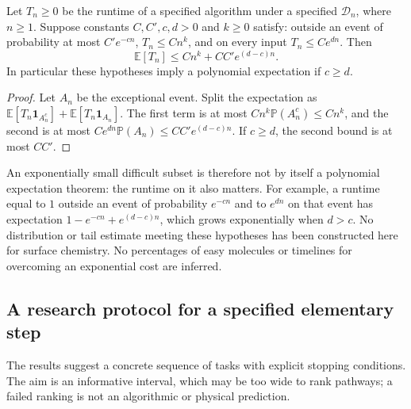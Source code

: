\begin{proposition}
\label{prop:average}
Let $T_n\ge0$ be the runtime of a specified algorithm under a specified
$\mathcal D_n$, where $n\ge1$. Suppose constants $C,C',c,d>0$ and
$k\ge0$ satisfy: outside an event of probability at most $C'e^{-cn}$,
$T_n\le Cn^k$, and on every input $T_n\le Ce^{dn}$. Then
\[
 \mathbb E[T_n]\le Cn^k+CC'e^{(d-c)n}.
\]
In particular these hypotheses imply a polynomial expectation if $c\ge d$.
\end{proposition}
\begin{proof}
Let $A_n$ be the exceptional event. Split the expectation as
$\mathbb E[T_n\boldsymbol1_{A_n^c}]+
\mathbb E[T_n\boldsymbol1_{A_n}]$.
The first term is at most $Cn^k\mathbb P(A_n^c)\le Cn^k$, and the
second is at most $Ce^{dn}\mathbb P(A_n)\le CC'e^{(d-c)n}$.
If $c\ge d$, the second bound is at most $CC'$.
\end{proof}

An exponentially small difficult subset is therefore not by itself a
polynomial expectation theorem: the runtime on it also matters. For example,
a runtime equal to $1$ outside an event of probability $e^{-cn}$ and to
$e^{dn}$ on that event has expectation
$1-e^{-cn}+e^{(d-c)n}$, which grows exponentially when $d>c$.
No distribution or tail estimate meeting these hypotheses has been
constructed here for surface chemistry. No percentages of easy molecules or
timelines for overcoming an exponential cost are inferred.

\subsection{A research protocol for a specified elementary step}
The results suggest a concrete sequence of tasks with explicit stopping
conditions. The aim is an informative interval, which may be too wide to
rank pathways; a failed ranking is not an algorithmic or physical prediction.

